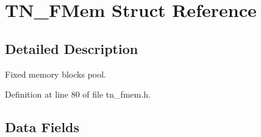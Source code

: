 \hypertarget{structTN__FMem}{\section{T\+N\+\_\+\+F\+Mem Struct Reference}
\label{structTN__FMem}
}


\subsection{Detailed Description}
Fixed memory blocks pool. 

Definition at line 80 of file tn\+\_\+fmem.\+h.

\subsection*{Data Fields}
